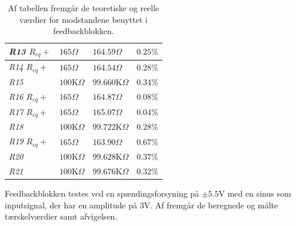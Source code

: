 \begin{table}[H]
\begin{tabular}{|l|l|l|l|}
\textit{R13 $R_{eq}+$}    & $165\Omega$              & $164.59\Omega$      & $0.25\%$           \\ \hline
\textit{R14 $R_{eq}+$}    & $165\Omega$              & $164.54\Omega$      & $0.28\%$           \\ \hline
\textit{R15}            & $100$K$\Omega$           & $99.660$K$\Omega$   & $0.34\%$           \\ \hline
\textit{R16 $R_{eq}+$}  & $165\Omega$              & $164.87\Omega$      & $0.08\%$           \\ \hline
\textit{R17 $R_{eq}+$}  & $165\Omega$              & $165.07\Omega$      & $0.04\%$           \\ \hline
\textit{R18}            & $100$K$\Omega$           & $99.722$K$\Omega$   & $0.28\%$           \\ \hline
\textit{R19 $R_{eq}+$}  & $165\Omega$              & $163.90\Omega$      & $0.67\%$           \\ \hline
\textit{R20}            & $100$K$\Omega$           & $99.628$K$\Omega$   & $0.37\%$           \\ \hline
\textit{R21}            & $100$K$\Omega$           & $99.676$K$\Omega$   & $0.32\%$           \\ \hline
\end{tabular}
\caption{Af tabellen fremgår de teoretiske og reelle værdier for modstandene benyttet i feedbackblokken.}
\label{Tab:komparator_modstande}
\end{table}
\noindent Feedbackblokken testes ved en spændingsforsyning på $\pm5.5$V med en sinus som inputsignal, der har en amplitude på $3$V. Af  fremgår de beregnede og målte tærskelværdier samt afvigelsen. 


